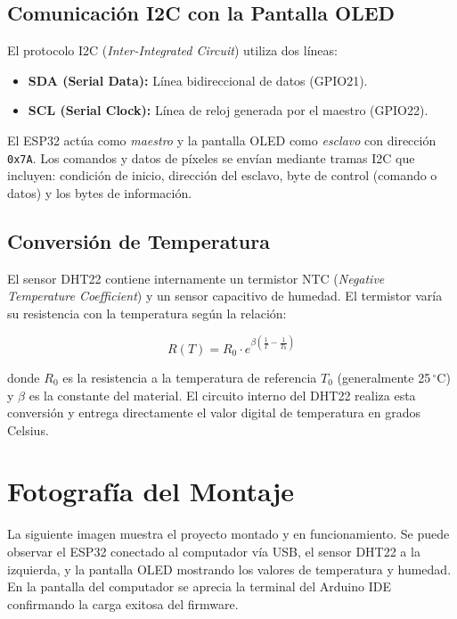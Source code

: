 \documentclass[12pt,a4paper]{article}
\begin{document}
\subsection{Comunicación I2C con la Pantalla OLED}
El protocolo I2C (\textit{Inter-Integrated Circuit}) utiliza dos líneas:
\begin{itemize}
    \item \textbf{SDA (Serial Data):} Línea bidireccional de datos (GPIO21).
    \item \textbf{SCL (Serial Clock):} Línea de reloj generada por el maestro (GPIO22).
\end{itemize}

El ESP32 actúa como \textit{maestro} y la pantalla OLED como \textit{esclavo} con dirección \texttt{0x7A}. Los comandos y datos de píxeles se envían mediante tramas I2C que incluyen: condición de inicio, dirección del esclavo, byte de control (comando o datos) y los bytes de información.

\subsection{Conversión de Temperatura}
El sensor DHT22 contiene internamente un termistor NTC (\textit{Negative Temperature Coefficient}) y un sensor capacitivo de humedad. El termistor varía su resistencia con la temperatura según la relación:

\begin{equation}
R(T) = R_0 \cdot e^{\beta\left(\frac{1}{T} - \frac{1}{T_0}\right)}
\label{eq:steinhart}
\end{equation}

donde $R_0$ es la resistencia a la temperatura de referencia $T_0$ (generalmente 25$\,^\circ$C) y $\beta$ es la constante del material. El circuito interno del DHT22 realiza esta conversión y entrega directamente el valor digital de temperatura en grados Celsius.

\section{Fotografía del Montaje}

La siguiente imagen muestra el proyecto montado y en funcionamiento. Se puede observar el ESP32 conectado al computador vía USB, el sensor DHT22 a la izquierda, y la pantalla OLED mostrando los valores de temperatura y humedad. En la pantalla del computador se aprecia la terminal del Arduino IDE confirmando la carga exitosa del firmware.
\end{document}
